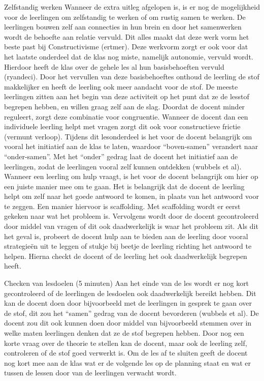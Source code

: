 \documentclass{article}
\begin{document}
{                Zelfstandig werken
                Wanneer de extra uitleg afgelopen is, is er nog de mogelijkheid voor de leerlingen om zelfstandig te werken of om rustig samen te werken. De leerlingen bouwen zelf aan connecties in hun brein en door het samenwerken wordt de behoefte aan relatie vervuld.
                Dit alles maakt dat deze werk vorm het beste past bij Constructivisme (ertmer). 
                Deze werkvorm zorgt er ook voor dat het laatste onderdeel dat de klas nog miste, namelijk autonomie, vervuld wordt. Hierdoor heeft de klas over de gehele les al hun basisbehoeften vervuld (ryandeci). Door het vervullen van deze basisbehoeftes onthoud de leerling de stof makkelijker en heeft de leerling ook meer aandacht voor de stof.
                De meeste leerlingen zitten aan het begin van deze activiteit op het punt dat ze de lesstof begrepen hebben, en willen graag zelf aan de slag. Doordat de docent minder reguleert, zorgt deze combinatie voor congruentie. Wanneer de docent dan een individuele leerling helpt met vragen zorgt dit ook voor constructieve frictie (vermunt verloop). 
                Tijdens dit lesonderdeel is het voor de docent belangrijk om vooral het initiatief aan de klas te laten, waardoor “boven-samen” verandert naar “onder-samen”. Met het “onder” gedrag laat de docent het initiatief aan de leerlingen, zodat de leerlingen vooral zelf kunnen ontdekken (wubbels et al). Wanneer een leerling om hulp vraagt, is het voor de docent belangrijk om hier op een juiste manier mee om te gaan. Het is belangrijk dat de docent de leerling helpt om zelf naar het goede antwoord te komen, in plaats van het antwoord voor te zeggen. Een manier hiervoor is scaffolding. Met scaffolding wordt er eerst gekeken naar wat het probleem is. Vervolgens wordt door de docent gecontroleerd door middel van vragen of dit ook daadwerkelijk is waar het probleem zit. Als dit het geval is, probeert de docent hulp aan te bieden aan de leerling door vooral strategieën uit te leggen of stukje bij beetje de leerling richting het antwoord te helpen. Hierna checkt de docent of de leerling het ook daadwerkelijk begrepen heeft.
                
                Checken van lesdoelen (5 minuten)
                Aan het einde van de les wordt er nog kort gecontroleerd of de leerlingen de lesdoelen ook daadwerkelijk bereikt hebben. Dit kan de docent doen door bijvoorbeeld met de leerlingen in gesprek te gaan over de stof, dit zou het “samen” gedrag van de docent bevorderen (wubbels et al). De docent zou dit ook kunnen doen door middel van bijvoorbeeld stemmen over in welke maten leerlingen denken dat ze de stof begrepen hebben.
                Door nog een korte vraag over de theorie te stellen kan de docent, maar ook de leerling zelf, controleren of de stof goed verwerkt is.
                Om de les af te sluiten geeft de docent nog kort mee aan de klas wat er de volgende les op de planning staat en wat er tussen de lessen door van de leerlingen verwacht wordt.
                
}
\end{document}
